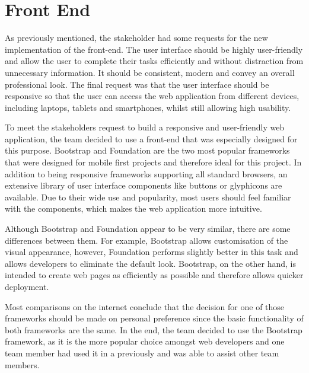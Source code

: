 \documentclass{l3proj}
\begin{document}
\section{Front End}
\par
As previously mentioned, the stakeholder had some requests for the new implementation of the front-end. The user interface should be highly user-friendly and allow the user to complete their tasks efficiently and without distraction from unnecessary information. It should be consistent, modern and convey an overall professional look. The final request was that the user interface should be responsive so that the user can access the web application from different devices, including laptops, tablets and smartphones, whilst still allowing high usability.\\
\par To meet the stakeholders request to build a responsive and user-friendly web application, the team decided to use a front-end that was especially designed for this purpose. Bootstrap and Foundation are the two most popular frameworks that were designed for mobile first projects and therefore ideal for this project. In addition to being responsive frameworks supporting all standard browsers, an extensive library of user interface components like buttons or glyphicons are available. Due to their wide use and popularity, most users should feel familiar with the components, which makes the web application more intuitive.\\
\par Although Bootstrap and Foundation appear to be very similar, there are some differences between them. For example, Bootstrap allows customisation of the visual appearance, however, Foundation performs slightly better in this task and allows developers to eliminate the default look. Bootstrap, on the other hand, is intended to create web pages as efficiently as possible and therefore allows quicker deployment.\\
\par Most comparisons on the internet conclude that the decision for one of those frameworks should be made on personal preference since the basic functionality of both frameworks are the same. In the end, the team decided to use the Bootstrap framework, as it is the more popular choice amongst web developers and one team member had used it in a previously and was able to assist other team members.\\

\end{document}
